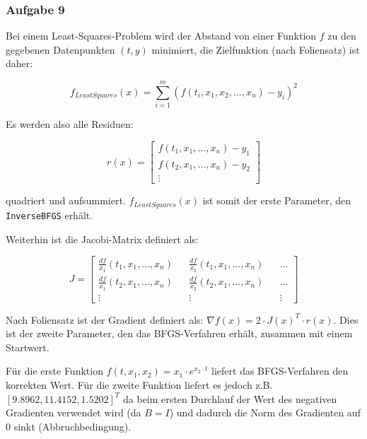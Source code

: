 \documentclass[a4paper, 12pt]{report}
\begin{document}
\subsubsection{Aufgabe 9}
Bei einem Least-Squares-Problem wird der Abstand von einer Funktion $f$ zu den gegebenen Datenpunkten $(t,y)$ minimiert,
die Zielfunktion (nach Foliensatz) ist daher:

$$f_{LeastSquares}(x) = \sum_{i=1}^m (f(t_i, x_1, x_2, ..., x_n) - y_i)^2$$

Es werden also alle Residuen:

$$r(x) = \begin{bmatrix}f(t_1, x_1, ..., x_n) - y_1\\f(t_2, x_1, ..., x_n) - y_2\\ \vdots \end{bmatrix}$$

quadriert und aufsummiert. $f_{LeastSquares}(x)$ ist somit der erste Parameter, den\\
\lstinline[basicstyle=\ttfamily\color{black}]|InverseBFGS| erhält.\par
Weiterhin ist die Jacobi-Matrix definiert als:

$$J = \begin{bmatrix}\frac{df}{x_1}(t_1, x_1, ..., x_n) && \frac{df}{x_2}(t_1, x_1, ..., x_n) && \ldots\\
            \frac{df}{x_1}(t_2, x_1, ..., x_n) && \frac{df}{x_2}(t_2, x_1, ..., x_n) && \ldots\\
            \vdots && \vdots && \vdots\end{bmatrix}$$

Nach Foliensatz ist der Gradient definiert als: $\nabla f(x) = 2\cdot J(x)^T\cdot r(x)$. Dies ist der zweite Parameter, den
das BFGS-Verfahren erhält, zusammen mit einem Startwert.\par
Für die erste Funktion $f(t, x_1, x_2) = x_1\cdot e^{x_2\cdot t}$ liefert das BFGS-Verfahren den korrekten Wert. Für die
zweite Funktion liefert es jedoch z.B.\\
$[9.8962, 11.4152, 1.5202]^T$ da beim ersten Durchlauf der Wert des negativen Gradienten
verwendet wird (da $B = I$) und dadurch die Norm des Gradienten auf 0 sinkt (Abbruchbedingung).
\end{document}
